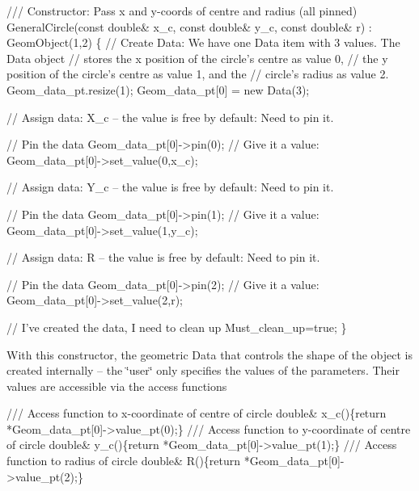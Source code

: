\begin{DoxyCodeInclude}
 \textcolor{comment}{/// Constructor:  Pass x and y-coords of centre and radius (all pinned)}
 GeneralCircle(\textcolor{keyword}{const} \textcolor{keywordtype}{double}& x\_c, \textcolor{keyword}{const} \textcolor{keywordtype}{double}& y\_c, 
               \textcolor{keyword}{const} \textcolor{keywordtype}{double}& r) : GeomObject(1,2)
  \{
   \textcolor{comment}{// Create Data: We have one Data item with 3 values. The Data object}
   \textcolor{comment}{// stores the x position of the circle's centre as value 0,}
   \textcolor{comment}{// the y position of the circle's centre as value 1, and the }
   \textcolor{comment}{// circle's radius as value 2.}
   Geom\_data\_pt.resize(1);
   Geom\_data\_pt[0] = \textcolor{keyword}{new} Data(3);
   
   \textcolor{comment}{// Assign data: X\_c -- the value is free by default: Need to pin it.}

   \textcolor{comment}{// Pin the data}
   Geom\_data\_pt[0]->pin(0); 
   \textcolor{comment}{// Give it a value: }
   Geom\_data\_pt[0]->set\_value(0,x\_c);

   \textcolor{comment}{// Assign data: Y\_c -- the value is free by default: Need to pin it.}

   \textcolor{comment}{// Pin the data}
   Geom\_data\_pt[0]->pin(1); 
   \textcolor{comment}{// Give it a value: }
   Geom\_data\_pt[0]->set\_value(1,y\_c);

   \textcolor{comment}{// Assign data: R -- the value is free by default: Need to pin it.}

   \textcolor{comment}{// Pin the data}
   Geom\_data\_pt[0]->pin(2); 
   \textcolor{comment}{// Give it a value: }
   Geom\_data\_pt[0]->set\_value(2,r);

   \textcolor{comment}{// I've created the data, I need to clean up}
   Must\_clean\_up=\textcolor{keyword}{true}; 
  \}

\end{DoxyCodeInclude}


With this constructor, the geometric {\ttfamily Data} that controls the shape of the object is created internally -- the \char`\"{}user\char`\"{} only specifies the values of the parameters. Their values are accessible via the access functions


\begin{DoxyCodeInclude}
 \textcolor{comment}{/// Access function to x-coordinate of centre of circle}
 \textcolor{keywordtype}{double}& x\_c()\{\textcolor{keywordflow}{return} *Geom\_data\_pt[0]->value\_pt(0);\}
\textcolor{comment}{}
\textcolor{comment}{ /// Access function to y-coordinate of centre of circle}
\textcolor{comment}{} \textcolor{keywordtype}{double}& y\_c()\{\textcolor{keywordflow}{return} *Geom\_data\_pt[0]->value\_pt(1);\}
\textcolor{comment}{}
\textcolor{comment}{ /// Access function to radius of circle}
\textcolor{comment}{} \textcolor{keywordtype}{double}& R()\{\textcolor{keywordflow}{return} *Geom\_data\_pt[0]->value\_pt(2);\}

\end{DoxyCodeInclude}


